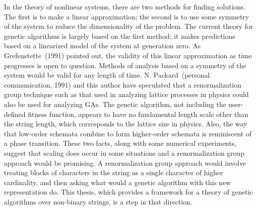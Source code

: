 In the theory of nonlinear systems, there are two methods for finding
solutions.  The first is to make a linear approximation; the second
is to use some symmetry of the system to reduce the dimensionality
of the problem.  The current theory for genetic algorithms is largely
based on the first method; it makes predictions based on a linearized
model of the system at generation zero.  As Grefenstette~(1991)
pointed out, the validity of this linear approximation as time
progresses is open to
question.  Methods of analysis based on a symmetry of the system would
be valid for any length of time.  N. Packard~(personal communication,
1991) and this author have
speculated that a renormalization group technique such as that used
in analyzing lattice processes in physics could also be used for analyzing
GAs.  The genetic algorithm, not including the user-defined fitness
function, appears to have no fundamental length scale other than
the string length, which corresponds to the lattice size in physics.
Also, the way that low-order schemata combine to form higher-order
schemata is reminiscent of a phase transition.  These two facts, along
with some numerical experiments, suggest that scaling does occur in
some situations and a renormalization group approach would be
promising.  A renormalization group approach would involve treating
blocks of characters in the string as a single character of higher cardinality,
and then asking what would a genetic algorithm with this new representation do.
This thesis, which provides a framework for a theory of genetic
algorithms over non-binary strings, is a step in that direction.


